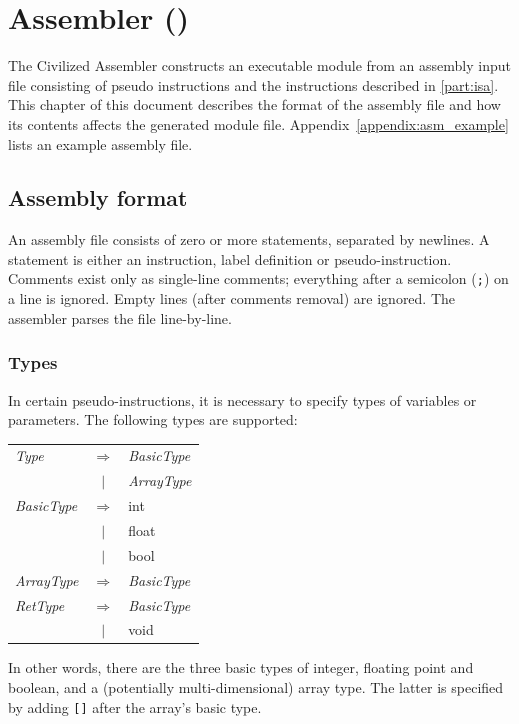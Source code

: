 \section{\civic{} Assembler (\civicas)}

The Civilized Assembler \civicas{} constructs an executable module from an assembly input file consisting of pseudo instructions and the instructions described in \autoref{part:isa}. This chapter of this document describes the format of the assembly file and how its contents affects the generated module file. Appendix~\ref{appendix:asm_example} lists an example assembly file.

\subsection{Assembly format}
An assembly file consists of zero or more statements, separated by newlines. A statement is either an instruction, label definition or pseudo-instruction. Comments exist only as single-line comments; everything after a semicolon (\texttt{;}) on a line is ignored. Empty lines (after comments removal) are ignored. The assembler parses the file line-by-line.

\subsubsection{Types}
In certain pseudo-instructions, it is necessary to specify types of variables or parameters. The following types are supported:

\begin{tabular}{lcl}
\emph{Type} &$\Rightarrow$& \emph{BasicType} \\
            &$\mid$& \emph{ArrayType} \\
\emph{BasicType} &$\Rightarrow$& {\ttfamily int} \\
                 &$\mid$& {\ttfamily float} \\
                 &$\mid$& {\ttfamily bool} \\
\emph{ArrayType} &$\Rightarrow$& \emph{BasicType} {\ttfamily []} \\
\emph{RetType} &$\Rightarrow$& \emph{BasicType} \\
               &$\mid$& {\ttfamily void} \\
\end{tabular}

In other words, there are the three basic types of integer, floating point and boolean, and a (potentially multi-dimensional) array type. The latter is specified by adding \texttt{[]} after the array's basic type.


